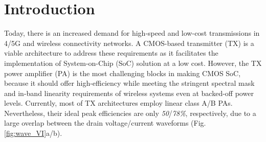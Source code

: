 \documentclass[conference]{IEEEtran}
\begin{document}
\section{Introduction}
Today, there is an increased demand for high-speed and low-cost transmissions in 4/5G and wireless connectivity networks. A CMOS-based transmitter (TX) is a viable architecture to address these requirements as it facilitates the implementation of System-on-Chip (SoC) solution at a low cost. However, the TX power amplifier (PA) is the most challenging blocks in making CMOS SoC, because it should offer high-efficiency while meeting the stringent spectral mask  and in-band linearity requirements of wireless systems even at backed-off power levels. Currently, most of TX architectures employ linear class A/B PAs. Nevertheless, their ideal  peak efficiencies are only \textit{50}/\textit{78\%}, respectively, due to a large overlap between the drain voltage/current waveforms (Fig.\ref{fig:wave_VI}a/b).
\end{document}
